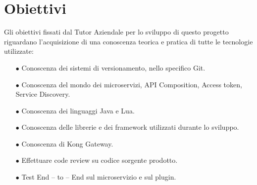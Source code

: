 \section{Obiettivi}\label{sec:obiettivi}
Gli obiettivi fissati dal Tutor Aziendale per lo sviluppo di questo progetto riguardano l'acquisizione di una conoscenza teorica e pratica di tutte le tecnologie utilizzate:
\begin{itemize}
	\item[$\bullet$]Conoscenza dei sistemi di versionamento, nello specifico Git.
	\item[$\bullet$]Conoscenza del mondo dei microservizi, API Composition, Access token, Service Discovery.
	\item[$\bullet$]Conoscenza dei linguaggi Java e Lua.
	\item[$\bullet$]Conoscenza delle librerie e dei framework utilizzati durante lo sviluppo.
	\item[$\bullet$]Conoscenza di Kong Gateway.
	\item[$\bullet$]Effettuare code review su codice sorgente prodotto.
	\item[$\bullet$]Test End – to – End sul microservizio e sul plugin.
\end{itemize}
